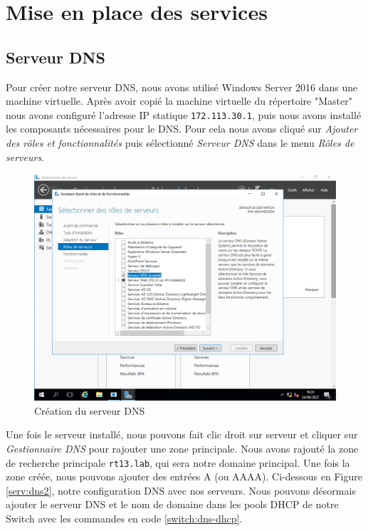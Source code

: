 \documentclass{article}
\begin{document}
\section{Mise en place des services}
\subsection{Serveur DNS}
Pour créer notre serveur DNS, nous avons utilisé Windows Server 2016 dans une machine virtuelle. Après avoir copié la machine virtuelle du répertoire "Master" nous avons configuré l'adresse IP statique \verb|172.113.30.1|, puis nous avons installé les composants nécessaires pour le DNS.
Pour cela nous avons cliqué sur \emph{Ajouter des rôles et fonctionnalités} puis sélectionné \emph{Serveur DNS} dans le menu \emph{Rôles de serveurs}.
\begin{figure}[H]
    \begin{center}
        \includegraphics[scale=0.55]{fig/dns1.png}
    \end{center}
    \caption{Création du serveur DNS}
    \label{serv:dns1}
\end{figure}
Une fois le serveur installé, nous pouvons fait clic droit sur serveur et cliquer sur \emph{Gestionnaire DNS} pour rajouter une zone principale.
Nous avons rajouté la zone de recherche principale \verb|rt13.lab|, qui sera notre domaine principal. Une fois la zone créée, nous pouvons ajouter des entrées A (ou AAAA). Ci-dessous en Figure \ref{serv:dns2}, notre configuration DNS avec nos serveurs.
Nous pouvons désormais ajouter le serveur DNS et le nom de domaine dans les pools DHCP de notre Switch avec les commandes en code \ref{switch:dns-dhcp}.
\end{document}
